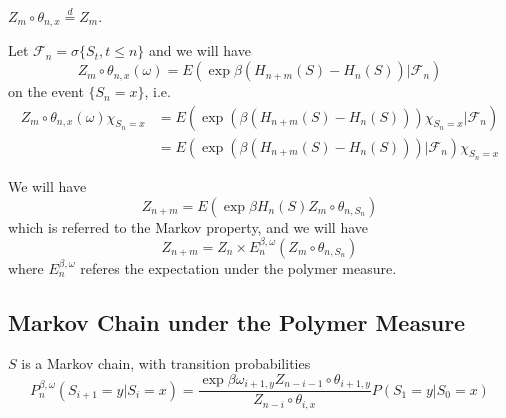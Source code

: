 \begin{proposition}
    $Z_m\circ \theta_{n,x} \overset{d}{=} Z_m$.
\end{proposition}

\begin{proposition}
    Let $\mathcal{F}_n = \sigma\{S_t, t \leq n\}$ and we will have
    \[
    Z_m \circ \theta_{n,x}(\omega) = E(\exp{\beta(H_{n+m}(S)- H_n(S))}| \mathcal{F}_n)
    \]
    on the event $\{S_n = x\}$, i.e.
    \[
    \begin{aligned}
        Z_m\circ \theta_{n,x}(\omega)\chi_{S_n = x} &= E(\exp{\left(\beta(H_{n+m}(S)- H_n(S))\right)}\chi_{S_n = x}| \mathcal{F}_n)\\ &= E(\exp{\left(\beta(H_{n+m}(S)- H_n(S))\right)}| \mathcal{F}_n)\chi_{S_n = x}
    \end{aligned}
    \]
\end{proposition}

\begin{proposition}
    We will have
    \[
    Z_{n+m} = E(\exp{\beta H_n(S)}Z_m\circ \theta_{n,S_n})
    \]
    which is referred to the Markov property, and we will have
    \[
    Z_{n+m} = Z_n \times E_{n}^{\beta,\omega}(Z_m \circ \theta_{n,S_n})
    \]
    where $E_n^{\beta,\omega}$ referes the expectation under the polymer measure.
\end{proposition}

\subsection{Markov Chain under the Polymer Measure}

\begin{proposition}
    $S$ is a Markov chain, with transition probabilities
    \[
    P_n^{\beta,\omega}(S_{i+1} = y|S_i = x) = \dfrac{\exp{\beta\omega_{i+1,y}} Z_{n-i-1}\circ \theta_{i+1,y}}{Z_{n-i}\circ \theta_{i,x}} P(S_1 = y|S_0 = x)
    \]
\end{proposition}

